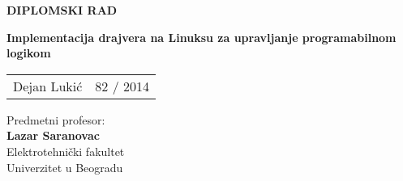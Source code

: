 	
\thispagestyle{empty}
\noindent
\noindent
\begin{center}
	\textup{\small {\bf DIPLOMSKI RAD}}\\[0.2in]
	\vspace{3in}

	
	
	\Large {\textbf {Implementacija drajvera na Linuksu za upravljanje programabilnom logikom }}\\[2in]
	

	\vspace{1in}
	\begin{table}[h]
		\centering
		\begin{tabular}{lr}
			Dejan Lukić & 82 / 2014 \\
		\end{tabular}
	\end{table}
	
	\vspace{0.1in}
	Predmetni profesor:\\
	{\textbf{Lazar Saranovac}}\\

	\vspace{1in}	
		\Large{Elektrotehni\v cki fakultet}\\
	\normalsize
	Univerzitet u Beogradu \\
	

	
	\vfill
	
\end{center}

\pagebreak